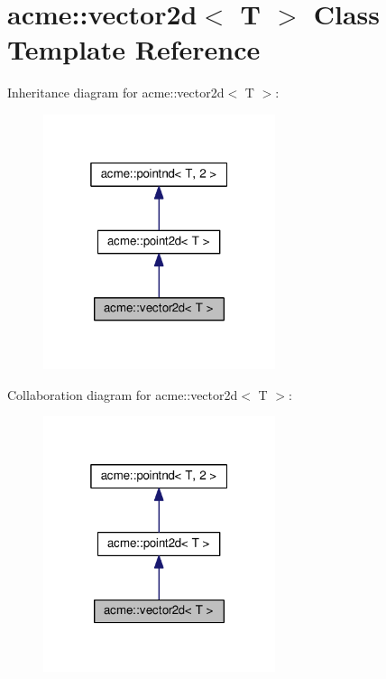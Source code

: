 \hypertarget{classacme_1_1vector2d}{}\section{acme\+:\+:vector2d$<$ T $>$ Class Template Reference}
\label{classacme_1_1vector2d}


Inheritance diagram for acme\+:\+:vector2d$<$ T $>$\+:
\nopagebreak
\begin{figure}[H]
\begin{center}
\leavevmode
\includegraphics[width=193pt]{d1/d4a/classacme_1_1vector2d__inherit__graph}
\end{center}
\end{figure}


Collaboration diagram for acme\+:\+:vector2d$<$ T $>$\+:
\nopagebreak
\begin{figure}[H]
\begin{center}
\leavevmode
\includegraphics[width=193pt]{dd/daa/classacme_1_1vector2d__coll__graph}
\end{center}
\end{figure}
